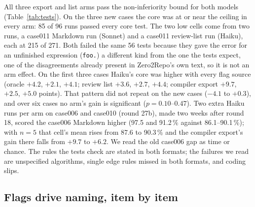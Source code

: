 \documentclass{article}
\newcommand{\code}[1]{\texttt{#1}}
\begin{document}
All three export and list arms pass the non-inferiority bound for both models (Table~\ref{tab:tests}). On
the three new cases the core was at or near the ceiling in every arm: 85 of 96 runs passed every core
test. The two low cells come from two runs, a case011 Markdown run (Sonnet) and a case011 review-list run
(Haiku), each at 215 of 271. Both failed the same 56 tests because they gave the error for an unfinished
expression (\code{foo.}) a different kind from the one the tests expect, one of the disagreements already
present in Zero2Repo's own text, so it is not an arm
effect. On the first three cases Haiku's core was higher with every flag source (oracle $+4.2$, $+2.1$,
$+4.1$; review list $+3.6$, $+2.7$, $+4.4$; compiler export $+9.7$, $+2.5$, $+5.0$ points). That pattern did not
repeat on the new cases ($-4.1$ to $+0.3$), and over six cases no arm's gain is significant
($p = 0.10$--$0.47$). Two extra Haiku runs per arm on case006 and case010 (round 27b), made two weeks after
round 18, scored the case006 Markdown higher (97.5 and 91.2\,\% against 86.1--90.1\,\%); with $n = 5$ that
cell's mean rises from 87.6 to 90.3\,\% and the compiler export's gain there falls from $+9.7$ to $+6.2$. We read
the old case006 gap as time or chance. The rules the tests check are stated in both formats; the failures
we read are unspecified algorithms, single edge rules missed in both formats, and coding slips.

\subsection{Flags drive naming, item by item}\label{sec:naming}
\end{document}
